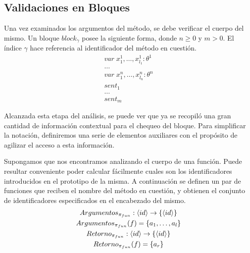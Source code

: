 \documentclass{article}
\begin{document}
\subsection{Validaciones en Bloques}

Una vez examinados los argumentos del método, se debe verificar el cuerpo del mismo.
Un bloque $block_\gamma$ posee la siguiente forma, donde $n \geq 0$ y $m > 0$.
El índice $\gamma$ hace referencia al identificador del método en cuestión.
\begin{gather*}
var \; x^1_1, \ldots, x^1_{l_1}: \theta^1
\\
\ldots
\\
var \; x^n_1, \ldots, x^n_{l_n}: \theta^n
\\
sent_1
\\
\ldots
\\
sent_m
\end{gather*}

Alcanzada esta etapa del análisis, se puede ver que ya se recopiló una gran cantidad de información contextual para el chequeo del bloque.
Para simplificar la notación, definiremos una serie de elementos auxiliares con el propósito de agilizar el acceso a esta información.

Supongamos que nos encontramos analizando el cuerpo de una función.
Puede resultar conveniente poder calcular fácilmente cuales son los identificadores introducidos en el prototipo de la misma.
A continuación se definen un par de funciones que reciben el nombre del método en cuestión, y obtienen el conjunto de identificadores especificados en el encabezado del mismo.
\begin{gather*}
Argumentos_{\pi_{fun}}: \langle id \rangle \rightarrow \{ \langle id \rangle \}
\\
Argumentos_{\pi_{fun}}(f) = \{ a_1, \ldots, a_l \}
\\
Retorno_{\pi_{fun}}: \langle id \rangle \rightarrow \{ \langle id \rangle \}
\\
Retorno_{\pi_{fun}}(f) = \{ a_r \}
\end{gather*}
\end{document}
